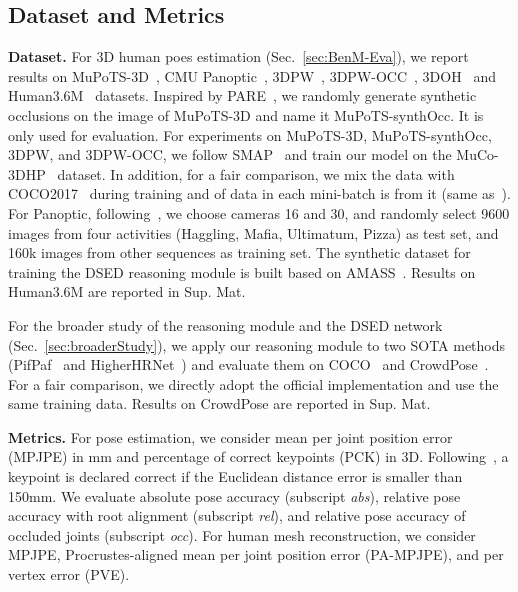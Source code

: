 \subsection{Dataset and Metrics}
\noindent\textbf{Dataset.}
For 3D human poes estimation (Sec.~\ref{sec:BenM-Eva}), we report results on MuPoTS-3D~\cite{mehta2018single}, CMU Panoptic~\cite{joo2015panoptic}, 3DPW~\cite{von2018recovering}, 3DPW-OCC~\cite{von2018recovering,zhang2020object}, 3DOH~\cite{zhang2020object} and Human3.6M~\cite{ionescu2013human3} datasets. Inspired by PARE~\cite{kocabas2021pare}, we randomly generate synthetic occlusions on the image of MuPoTS-3D and name it MuPoTS-synthOcc. It is only used for evaluation. For experiments on MuPoTS-3D, MuPoTS-synthOcc, 3DPW, and 3DPW-OCC, we follow SMAP~\cite{zhen2020smap} and train our model on the MuCo-3DHP~\cite{mehta2018single} dataset. In addition, for a fair comparison, we mix the data with COCO2017~\cite{lin2014microsoft} during training and  of data in each mini-batch is from it (same as~\cite{mehta2018single,mehta2017vnect,zhen2020smap}). For Panoptic, following~\cite{zanfir2018monocular,zhen2020smap}, we choose cameras 16 and 30, and randomly select 9600 images from four activities (Haggling, Mafia, Ultimatum, Pizza) as test set, and 160k images from other sequences as training set. The synthetic dataset for training the DSED reasoning module is built based on AMASS~\cite{mahmood2019amass}. Results on Human3.6M are reported in Sup. Mat.

For the broader study of the reasoning module and the DSED network (Sec.~\ref{sec:broaderStudy}), we apply our reasoning module to two SOTA methods (PifPaf~\cite{kreiss2019pifpaf} and  HigherHRNet~\cite{cheng2020higherhrnet}) and evaluate them on COCO~\cite{lin2014microsoft} and CrowdPose~\cite{li2019crowdpose}. For a fair comparison, we directly adopt the official implementation and use the same training data. Results on CrowdPose are reported in Sup. Mat.

\noindent\textbf{Metrics.}
For pose estimation, we consider mean per joint position error (MPJPE) in mm and percentage of correct keypoints (PCK) in 3D. Following~\cite{zhen2020smap}, a keypoint is declared correct if the Euclidean distance error is smaller than 150mm. We evaluate absolute pose accuracy (subscript \textit{abs}), relative pose accuracy with root alignment (subscript \textit{rel}), and relative pose accuracy of occluded joints (subscript \textit{occ}). For human mesh reconstruction, we consider MPJPE, Procrustes-aligned mean per joint position error (PA-MPJPE), and per vertex error (PVE).

